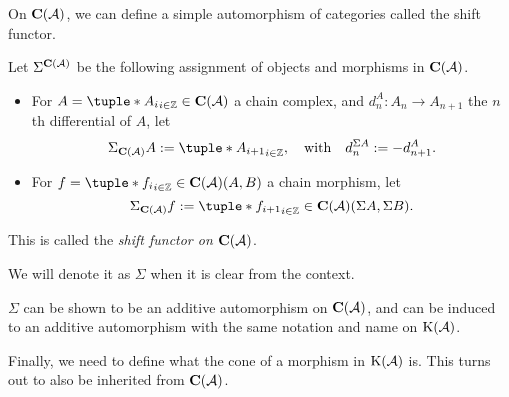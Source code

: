 On \( \operatorname{\mathbf{C}}({\mathcal{A}}) \), we can define a simple automorphism of categories called the shift functor.

\begin{definition}
    \label{def:chain_complex_shift}
    Let \( \Sigma^{\operatorname{\mathbf{C}}({\mathcal{A}})} \) be the following assignment of objects and morphisms in \( \operatorname{\mathbf{C}}({\mathcal{A}}) \).

    \begin{itemize}
        \item {
            For \( A = \tuple*{A_i}_{i \in \Zb} \in \C(\Ac) \) a chain complex, and \( d_n^A: A_n \to A_{n + 1} \) the \( n \)th differential of \( A \), let
            \[
                \Sigma_{\C(\Ac)} A := \tuple*{A_{i + 1}}_{i \in \Zb}, \quad \text{with} \quad d_n^{\Sigma A} := -d_{n + 1}^A.
            \]
        }
        \item {
            For \( f = \tuple*{f_i}_{i \in \Zb} \in \C(\Ac)(A, B) \) a chain morphism, let
            \[
                \Sigma_{\C(\Ac)} f := \tuple*{f_{i + 1}}_{i \in \Zb} \in \C(\Ac)(\Sigma A, \Sigma B).
            \]
        }
    \end{itemize}
    
    This is called the \emph{shift functor on \( \operatorname{\mathbf{C}}({\mathcal{A}}) \)}.

    We will denote it as \( \Sigma \) when it is clear from the context.
\end{definition}

\( \Sigma \) can be shown to be an additive automorphism on \( \operatorname{\mathbf{C}}({\mathcal{A}}) \), and can be induced to an additive automorphism with the same notation and name on \( \operatorname{K}({\mathcal{A}}) \).

Finally, we need to define what the cone of a morphism in \( \operatorname{K}({\mathcal{A}}) \) is. This turns out to also be inherited from \( \operatorname{\mathbf{C}}({\mathcal{A}}) \).

